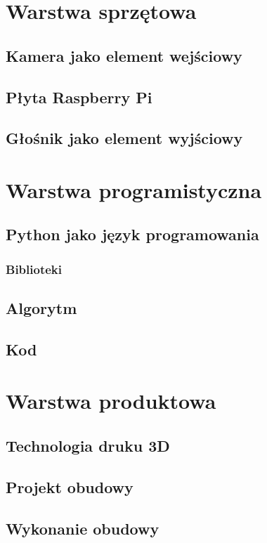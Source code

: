 \documentclass[a4paper,12pt,reqno]{article}
\begin{document}
\newpage
\section{Warstwa sprzętowa}
\subsection{Kamera jako element wejściowy}
\subsection{Płyta Raspberry Pi}
\subsection{Głośnik jako element wyjściowy}

\newpage
\section{Warstwa programistyczna}
\subsection{Python jako język programowania}
\subsubsection{Biblioteki}
\subsection{Algorytm}
\subsection{Kod}

\newpage
\section{Warstwa produktowa}
\subsection{Technologia druku 3D}
\subsection{Projekt obudowy}
\subsection{Wykonanie obudowy}
\end{document}
